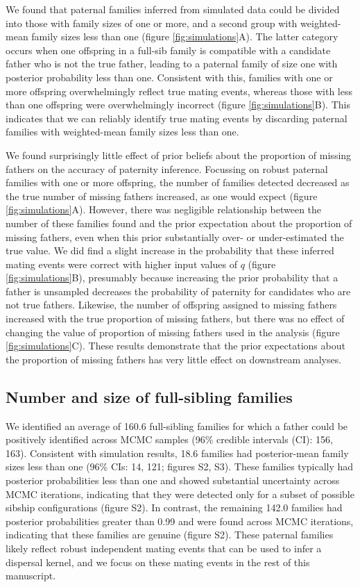 \documentclass[10pt, a4paper, twocolumn]{article} %
\begin{document}
We found that paternal families inferred from simulated data could be divided into those with family sizes of one or more, and a second group with weighted-mean family sizes less than one (figure \ref{fig:simulations}A).
The latter category occurs when one offspring in a full-sib family is compatible with a candidate father who is not the true father, leading to a paternal family of size one with posterior probability less than one.
Consistent with this, families with one or more offspring overwhelmingly reflect true mating events, whereas those with less than one offspring were overwhelmingly incorrect (figure \ref{fig:simulations}B).
This indicates that we can reliably identify true mating events by discarding paternal families with weighted-mean family sizes less than one.

We found surprisingly little effect of prior beliefs about the proportion of missing fathers on the accuracy of paternity inference.
Focussing on robust paternal families with one or more offspring, the number of families detected decreased as the true number of missing fathers increased, as one would expect (figure \ref{fig:simulations}A).
However, there was negligible relationship between the number of these families found and the prior expectation about the proportion of missing fathers, even when this prior substantially over- or under-estimated the true value.
We did find a slight increase in the probability that these inferred mating events were correct with higher input values of $q$ (figure \ref{fig:simulations}B), presumably because increasing the prior probability that a father is unsampled decreases the probability of paternity for candidates who are not true fathers.
Likewise, the number of offspring assigned to missing fathers increased with the true proportion of missing fathers, but there was no effect of changing the value of proportion of missing fathers used in the analysis (figure \ref{fig:simulations}C).
These results demonstrate that the prior expectations about the proportion of missing fathers has very little effect on downstream analyses.

\subsection{Number and size of full-sibling families}

We identified an average of 160.6 full-sibling families for which a father could be positively identified across MCMC samples (96\% credible intervals (CI): 156, 163).
Consistent with simulation results, 18.6 families had posterior-mean family sizes less than one (96\% CIs: 14, 121; figures S2, S3).
These families typically had posterior probabilities less than one and showed substantial uncertainty across MCMC iterations, indicating that they were detected only for a subset of possible sibship configurations (figure S2).
In contrast, the remaining 142.0 families had posterior probabilities greater than 0.99 and were found across MCMC iterations, indicating that these families are genuine (figure S2).
These paternal families likely reflect robust independent mating events that can be used to infer a dispersal kernel, and we focus on these mating events in the rest of this manuscript.
\end{document}
